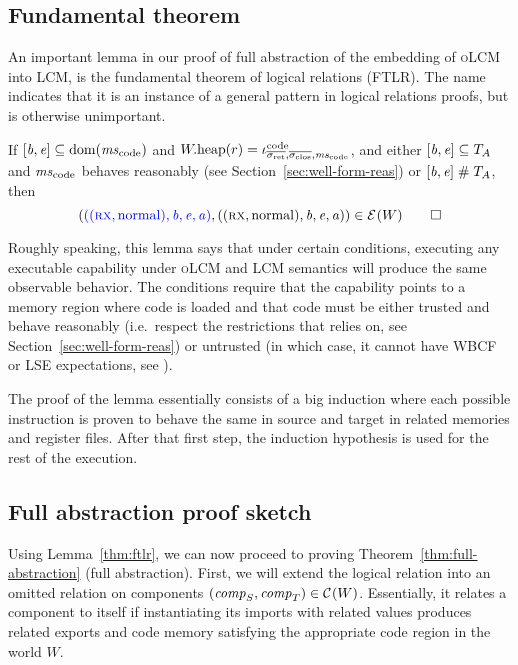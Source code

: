 \documentclass[acmsmall,review,showframe]{acmart}\settopmatter{printfolios=true,printccs=false,printacmref=false}
\renewcommand{\npair}[2][n]{#2}
\renewcommand{\lre}[1][]{\typesetlr{E}^{#1}}
\renewcommand{\lrcomp}[1][]{\typesetlr{C}^{#1}}
\renewcommand{\codereg}[2][\mathrm{code}]{\iota^{#1}_{#2}}
\newcommand{\trgcm}{\textsc{LCM}}
\newcommand{\srccm}{\textsc{oLCM}}
\begin{document}
\subsection{Fundamental theorem}
An important lemma in our proof of full abstraction of the embedding of \srccm{} into \trgcm{}, is the fundamental theorem of logical relations (FTLR).
The name indicates that it is an instance of a general pattern in logical relations proofs, but is otherwise unimportant.
\begin{lemma}
  \label{thm:ftlr}
  If $[\baddr,\eaddr] \subseteq \dom(\mscode)$ and $\pwheap(r) = \codereg{\sigrets,\sigcloss,\mscode}$, and either $[\mathit{b},\mathit{e}] \subseteq T_{A}$ and $\mscode$ behaves reasonably (see Section~\ref{sec:well-form-reas}) or
$[\mathit{b},\mathit{e}] \mathrel{\#} T_{A}$,
then 
  \[
    \npair{\left(\src{((\rx,\normal),\baddr,\eaddr,\aaddr)}, ((\rx,\normal),\baddr,\eaddr,\aaddr)\right)} \in \lre(W) \qedhere
  \]
\end{lemma}

Roughly speaking, this lemma says that under certain conditions, executing any executable capability under \srccm{} and \trgcm{} semantics will produce the same observable behavior.
The conditions require that the capability points to a memory region where code is loaded and that code must be either trusted and behave reasonably (i.e.\ respect the restrictions that \stktokens{} relies on, see Section~\ref{sec:well-form-reas}) or untrusted (in which case, it cannot have WBCF or LSE expectations, see ).

The proof of the lemma essentially consists of a big induction where each possible instruction is proven to behave the same in source and target in related memories and register files.
After that first step, the induction hypothesis is used for the rest of the execution.

\subsection{Full abstraction proof sketch}
\label{subsec:proof-sketch}
Using Lemma~\ref{thm:ftlr}, we can now proceed to proving Theorem~\ref{thm:full-abstraction} (full abstraction).
First, we will extend the logical relation into an omitted relation on components $(\var{comp}_S,\var{comp}_T) \in \lrcomp(W)$.
Essentially, it relates a component to itself if instantiating its imports with related values produces related exports and code memory satisfying the appropriate code region in the world $W$.
\end{document}
